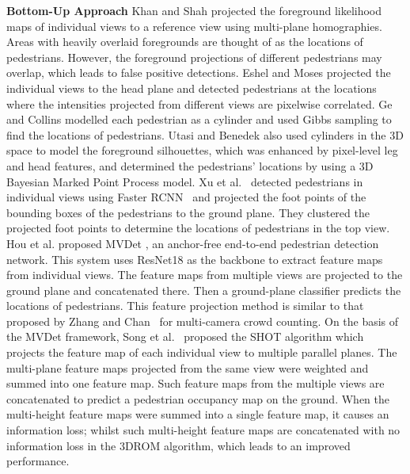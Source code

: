 \documentclass[runningheads]{llncs}
\begin{document}
	\textbf{Bottom-Up Approach}
	Khan and Shah \cite{KhanS06}\cite{khan2008tracking} projected the foreground likelihood maps of individual views to a reference view using multi-plane homographies. Areas with heavily overlaid foregrounds are thought of as the locations of pedestrians. However, the foreground projections of different pedestrians may overlap, which leads to false positive detections.
	Eshel and Moses \cite{eshel2010tracking} projected the individual views to the head plane and detected pedestrians at the locations where the intensities projected from different views are pixelwise correlated.
Ge and Collins \cite{ge2010crowd} modelled each pedestrian as a cylinder and used Gibbs sampling to find the locations of pedestrians.
Utasi and Benedek \cite{utasi2012bayesian} also used cylinders in the 3D space to model the foreground silhouettes, which was enhanced by pixel-level leg and head features, and determined the pedestrians' locations by using a 3D Bayesian Marked Point Process model.
Xu et al.~\cite{xu2016multi} detected pedestrians in individual views using Faster RCNN~\cite{ren2016faster} and projected the foot points of the bounding boxes of the pedestrians to the ground plane. They clustered the projected foot points to determine the locations of pedestrians in the top view. Hou et al. proposed MVDet \cite{hou2020multiview}, an anchor-free end-to-end pedestrian detection network. This system uses ResNet18 \cite{he2016deep} as the backbone to extract feature maps from individual views. The feature maps from multiple views are projected to the ground plane and concatenated there. Then a ground-plane classifier predicts the locations of pedestrians. This feature projection method is similar to that proposed by Zhang and Chan~\cite{zhang2019wide}\cite{zhang2021cross} for multi-camera crowd counting.
On the basis of the MVDet framework, Song et al.~\cite{song2021stacked} proposed the SHOT algorithm which projects the feature map of each individual view to multiple parallel planes. The multi-plane feature maps projected from the same view were weighted and summed into one feature map. Such feature maps from the multiple views are concatenated to predict a pedestrian occupancy map on the ground. When the multi-height feature maps were summed into a single feature map, it causes an information loss; whilst such multi-height feature maps are concatenated with no information loss in the 3DROM algorithm, which leads to an improved performance.
	


	
\end{document}
